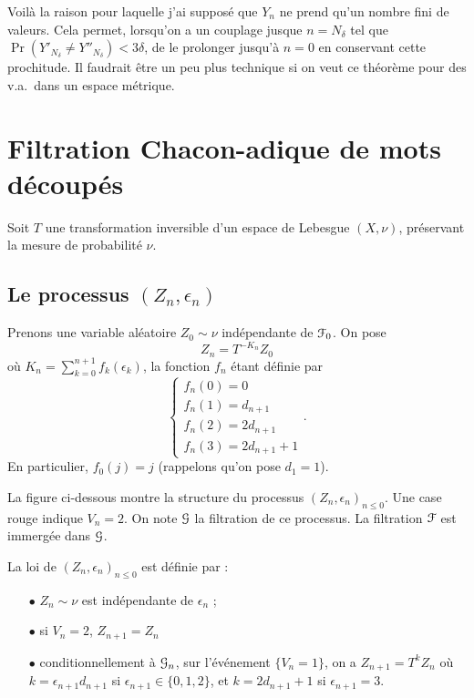 \documentclass[12pt,a4paper]{article}
\begin{document}
\begin{remarque}
Voilà la raison pour laquelle j'ai supposé que $Y_n$ ne prend qu'un nombre fini de 
valeurs. Cela permet, lorsqu'on a un couplage jusque $n=N_\delta$ tel que 
$\Pr(Y'_{N_\delta} \neq Y''_{N_\delta}) < 3\delta$, de le prolonger jusqu'à 
$n=0$ en conservant cette prochitude. Il faudrait \^etre un peu plus technique 
si on veut ce théorème pour des v.a.\ dans un espace métrique. 
\end{remarque}
\section{Filtration Chacon-adique de mots découpés}

Soit $T$ une transformation inversible d'un espace de Lebesgue $(X,\nu)$, 
préservant la mesure de probabilité $\nu$. 

\subsection{Le processus $(Z_n,\epsilon_n)$}

Prenons une variable aléatoire $Z_0 \sim \nu$ indépendante de $\EuScript{F}_0$. 
On pose 
$$
Z_n = T^{-K_n}Z_0
$$
où $K_n=\sum_{k=0}^{n+1}f_k(\epsilon_k)$, la fonction $f_n$ étant définie par 
$$
\begin{cases}
f_n(0) = 0 \\ 
f_n(1) = d_{n+1} \\ 
f_n(2) = 2d_{n+1} \\
f_n(3) = 2 d_{n+1} + 1
\end{cases}.
$$
En particulier, $f_0(j)=j$ (rappelons qu'on pose $d_1=1$). 

La figure ci-dessous montre la structure du processus ${(Z_n, \epsilon_n)}_{n \leq 0}$. 
Une case rouge indique $V_n=2$. 
On note $\EuScript{G}$ la filtration de ce processus. La filtration $\EuScript{F}$ est immergée dans $\EuScript{G}$. 

La loi de ${(Z_n, \epsilon_n)}_{n \leq 0}$ est définie par : 
\begin{itemize}
\item[$\bullet$] $Z_n \sim \nu$ est indépendante de $\epsilon_n$ ;

\item[$\bullet$] si $V_n=2$, $Z_{n+1} = Z_n$ 

\item[$\bullet$] conditionnellement à $\EuScript{G}_n$, sur l'événement $\{V_n=1\}$, 
on a $Z_{n+1} = T^k Z_n$ où $k=\epsilon_{n+1} d_{n+1}$ si $\epsilon_{n+1} \in \{0, 1, 2\}$, 
et $k = 2 d_{n+1} + 1$ si $\epsilon_{n+1}=3$. 
\end{itemize}
\end{document}
